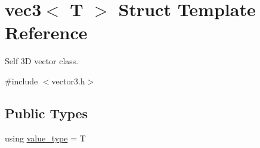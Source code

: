 \hypertarget{structvec3}{}\section{vec3$<$ T $>$ Struct Template Reference}
\label{structvec3}


Self 3D vector class.  




{\ttfamily \#include $<$vector3.\+h$>$}

\subsection*{Public Types}
\begin{DoxyCompactItemize}
\item 
using \mbox{\hyperlink{structvec3_a20de853e5a37c5197acba3e136a66735}{value\+\_\+type}} = T
\end{DoxyCompactItemize}

